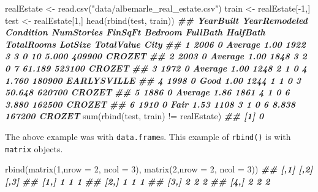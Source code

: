 \documentclass[
  12pt,
  krantz2]{krantz}
\makeatletter
\newenvironment{Shaded}{\begin{snugshade}}{\end{snugshade}}
\newcommand{\AttributeTok}[1]{\textcolor[rgb]{0.61,0.61,0.61}{#1}}
\newcommand{\DecValTok}[1]{\textcolor[rgb]{0.06,0.06,0.06}{#1}}
\newcommand{\DocumentationTok}[1]{\textcolor[rgb]{0.37,0.37,0.37}{\textbf{\textit{#1}}}}
\newcommand{\FunctionTok}[1]{\textcolor[rgb]{0,0,0}{#1}}
\newcommand{\NormalTok}[1]{#1}
\newcommand{\OtherTok}[1]{\textcolor[rgb]{0.37,0.37,0.37}{#1}}
\newcommand{\SpecialCharTok}[1]{\textcolor[rgb]{0,0,0}{#1}}
\newcommand{\StringTok}[1]{\textcolor[rgb]{0.5,0.5,0.5}{#1}}
\newenvironment{kframe}{%
\medskip{}
\setlength{\fboxsep}{.8em}
 \def\at@end@of@kframe{}%
 \ifinner\ifhmode%
  \def\at@end@of@kframe{\end{minipage}}%
  \begin{minipage}{\columnwidth}%
 \fi\fi%
 \def\FrameCommand##1{\hskip\@totalleftmargin \hskip-\fboxsep
 \colorbox{shadecolor}{##1}\hskip-\fboxsep
     \hskip-\linewidth \hskip-\@totalleftmargin \hskip\columnwidth}%
 \MakeFramed {\advance\hsize-\width
   \@totalleftmargin\z@ \linewidth\hsize
   \@setminipage}}%
 {\par\unskip\endMakeFramed%
 \at@end@of@kframe}
\renewenvironment{Shaded}{\begin{kframe}}{\end{kframe}}
\makeatother
\begin{document}
\begin{Shaded}
\begin{Highlighting}[]
\NormalTok{realEstate }\OtherTok{\textless{}{-}} \FunctionTok{read.csv}\NormalTok{(}\StringTok{"data/albemarle\_real\_estate.csv"}\NormalTok{)}
\NormalTok{train }\OtherTok{\textless{}{-}}\NormalTok{ realEstate[}\SpecialCharTok{{-}}\DecValTok{1}\NormalTok{,]}
\NormalTok{test }\OtherTok{\textless{}{-}}\NormalTok{ realEstate[}\DecValTok{1}\NormalTok{,]}
\FunctionTok{head}\NormalTok{(}\FunctionTok{rbind}\NormalTok{(test, train))}
\DocumentationTok{\#\#   YearBuilt YearRemodeled Condition NumStories FinSqFt Bedroom FullBath HalfBath TotalRooms LotSize TotalValue        City}
\DocumentationTok{\#\# 1      2006             0   Average       1.00    1922       3        3        0         10   5.000     409900      CROZET}
\DocumentationTok{\#\# 2      2003             0   Average       1.00    1848       3        2        0          7  61.189     523100      CROZET}
\DocumentationTok{\#\# 3      1972             0   Average       1.00    1248       2        1        0          4   1.760     180900 EARLYSVILLE}
\DocumentationTok{\#\# 4      1998             0      Good       1.00    1244       1        1        0          3  50.648     620700      CROZET}
\DocumentationTok{\#\# 5      1886             0   Average       1.86    1861       4        1        0          6   3.880     162500      CROZET}
\DocumentationTok{\#\# 6      1910             0      Fair       1.53    1108       3        1        0          6   8.838     167200      CROZET}
\FunctionTok{sum}\NormalTok{(}\FunctionTok{rbind}\NormalTok{(test, train) }\SpecialCharTok{!=}\NormalTok{ realEstate)}
\DocumentationTok{\#\# [1] 0}
\end{Highlighting}
\end{Shaded}

The above example was with \texttt{data.frame}s. This example of \texttt{rbind()} is with \texttt{matrix} objects.

\begin{Shaded}
\begin{Highlighting}[]
\FunctionTok{rbind}\NormalTok{(}\FunctionTok{matrix}\NormalTok{(}\DecValTok{1}\NormalTok{,}\AttributeTok{nrow =} \DecValTok{2}\NormalTok{, }\AttributeTok{ncol =} \DecValTok{3}\NormalTok{), }
      \FunctionTok{matrix}\NormalTok{(}\DecValTok{2}\NormalTok{,}\AttributeTok{nrow =} \DecValTok{2}\NormalTok{, }\AttributeTok{ncol =} \DecValTok{3}\NormalTok{))}
\DocumentationTok{\#\#      [,1] [,2] [,3]}
\DocumentationTok{\#\# [1,]    1    1    1}
\DocumentationTok{\#\# [2,]    1    1    1}
\DocumentationTok{\#\# [3,]    2    2    2}
\DocumentationTok{\#\# [4,]    2    2    2}
\end{Highlighting}
\end{Shaded}
\end{document}
